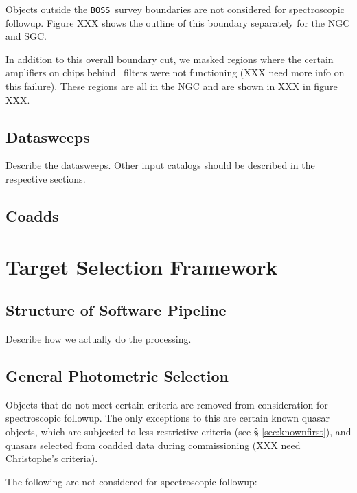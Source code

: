 \documentclass[12pt,preprint]{aastex}
\newcommand{\boss}{\texttt{BOSS}}
\begin{document}
Objects outside the \boss\ survey boundaries are not considered for
spectroscopic followup. Figure XXX shows the outline of this boundary separately
for the NGC and SGC.

In addition to this overall boundary cut, we masked regions where the certain
amplifiers on chips behind \umag\ filters were not functioning (XXX need more
info on this failure).  These regions are all in the NGC and are shown in XXX
in figure XXX.

\subsection{Datasweeps} \label{sec:sweeps}

Describe the datasweeps. Other input catalogs should be described in the
respective sections.

\subsection{Coadds}


\section{Target Selection Framework}

\subsection{Structure of Software Pipeline} \label{sec:structure}

Describe how we actually do the processing.

\subsection{General Photometric Selection} \label{sec:genselect}

Objects that do not meet certain criteria are removed from consideration for
spectroscopic followup. The only exceptions to this are certain known quasar
objects, which are subjected to less restrictive criteria (see \S
\ref{sec:knownfirst}), and quasars selected from coadded data during
commissioning (XXX need Christophe's criteria).


The following are not considered for spectroscopic followup:
\end{document}
